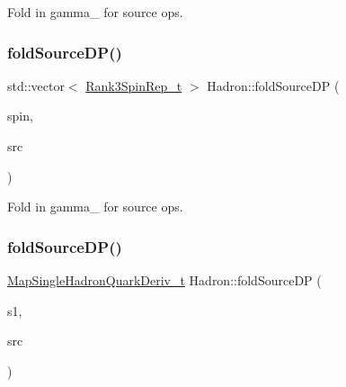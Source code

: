 Fold in gamma\+\_ for source ops. 

\mbox{\label{namespaceHadron_a121d64f8eb61ea3fc51116de1c659ee5}} 
\subsubsection{\texorpdfstring{foldSourceDP()}{foldSourceDP()}\hspace{0.1cm}{\footnotesize\ttfamily [5/7]}}
{\footnotesize\ttfamily std\+::vector$<$ \mbox{\hyperlink{structHadron_1_1Rank3SpinRep__t}{Rank3\+Spin\+Rep\+\_\+t}} $>$ Hadron\+::fold\+Source\+DP (\begin{DoxyParamCaption}\item[{const std\+::vector$<$ \mbox{\hyperlink{structHadron_1_1Rank3SpinRep__t}{Rank3\+Spin\+Rep\+\_\+t}} $>$ \&}]{spin,  }\item[{bool}]{src }\end{DoxyParamCaption})}



Fold in gamma\+\_ for source ops. 

\mbox{\label{namespaceHadron_af80d375e34002f168b53c74370f8dd3a}} 
\subsubsection{\texorpdfstring{foldSourceDP()}{foldSourceDP()}\hspace{0.1cm}{\footnotesize\ttfamily [6/7]}}
{\footnotesize\ttfamily \mbox{\hyperlink{namespaceHadron_aa588220689caea8a6aad4d0296526e6b}{Map\+Single\+Hadron\+Quark\+Deriv\+\_\+t}} Hadron\+::fold\+Source\+DP (\begin{DoxyParamCaption}\item[{const \mbox{\hyperlink{namespaceHadron_aa588220689caea8a6aad4d0296526e6b}{Map\+Single\+Hadron\+Quark\+Deriv\+\_\+t}} \&}]{s1,  }\item[{bool}]{src }\end{DoxyParamCaption})}

